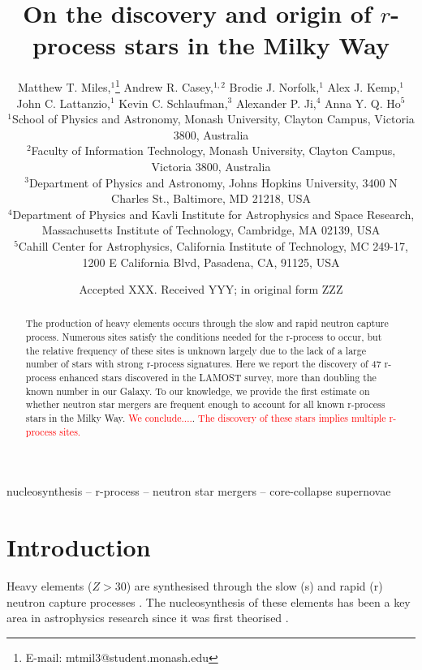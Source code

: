 \documentclass[a4paper,fleqn,usenatbib]{mnras}
\title[Discovery and origin of $r$-process stars]{On the discovery and origin of $r$-process stars in the Milky Way}
\author[Matthew T. Miles et al.]{Matthew T. Miles,$^{1}$\thanks{E-mail: mtmil3@student.monash.edu}
	Andrew R. Casey,$^{1,2}$
	Brodie J. Norfolk,$^{1}$
	Alex J. Kemp,$^{1}$\newauthor
	John C. Lattanzio,$^{1}$
	Kevin C. Schlaufman,$^{3}$
	Alexander P. Ji,$^{4}$
	Anna Y. Q. Ho$^{5}$
	\\
	$^{1}$School of Physics and Astronomy, Monash University, Clayton Campus, Victoria 3800, Australia\\
	$^{2}$Faculty of Information Technology, Monash University, Clayton Campus, Victoria 3800, Australia\\
	$^{3}$Department of Physics and Astronomy, Johns Hopkins University, 3400 N Charles St., Baltimore, MD 21218, USA\\
	$^{4}$Department of Physics and Kavli Institute for Astrophysics and Space Research, Massachusetts Institute of Technology, Cambridge, MA 02139, USA\\
	$^{5}$Cahill Center for Astrophysics, California Institute of Technology, MC 249-17, 1200 E California Blvd, Pasadena, CA, 91125, USA
}
\date{Accepted XXX. Received YYY; in original form ZZZ}
\newcommand{\todo}[1]{\textcolor{red}{#1}}
\begin{document}
	\label{firstpage}
	\pagerange{\pageref{firstpage}--\pageref{lastpage}}
	\maketitle
	
	\begin{abstract}
		The production of heavy elements occurs through the slow and rapid neutron capture process. Numerous sites satisfy the conditions needed for the r-process to occur, but the relative frequency of these sites is unknown largely due to the lack of a large number of stars with strong r-process signatures. Here we report the discovery of 47 r-process enhanced stars discovered in the LAMOST survey, more than doubling the known number in our Galaxy. To our knowledge, we provide the first estimate on whether neutron star mergers are frequent enough to account for all known r-process stars in the Milky Way. \todo{We conclude....}. \todo{The discovery of these stars implies multiple r-process sites.}
	\end{abstract}
	
	\begin{keywords}
		nucleosynthesis -- r-process -- neutron star mergers -- core-collapse supernovae
	\end{keywords}
	
	
	\section{Introduction}
	
	Heavy elements ($Z > 30$) are synthesised through the slow (s) and rapid (r) neutron capture processes \citep{Sneden2008}. The nucleosynthesis of these elements has been a key area in astrophysics research since it was first theorised  \citep{Burbidge1957}.
	
\end{document}
